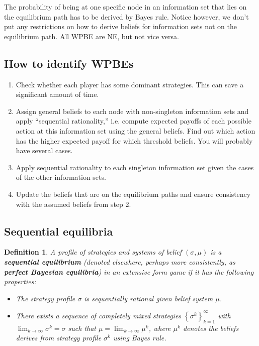 \documentclass[10pt]{article}
\theoremstyle{basic}
\newtheorem{definition}{Definition}[section]
\begin{document}
\begin{spacing}{1.0}
The probability of being at one specific node in an information set that
lies on the equilibrium path has to be derived by Bayes rule. Notice
however, we don't put any restrictions on how to derive beliefs for
information sets not on the equilibrium path. All WPBE are NE, but not vice versa.

\subsection{How to identify WPBEs}

\begin{enumerate}
\item Check whether each player has some dominant strategies. This can save
  a significant amount of time.
\item Assign general beliefs to each node with non-singleton information
  sets and apply ``sequential rationality,'' i.e. compute expected payoffs
  of each possible action at this information set using the general
  beliefs. Find out which action has the higher expected payoff for which
  threshold beliefs. You will probably have several cases.
\item Apply sequential rationality to each singleton information set given
  the cases of the other information sets.
\item Update the beliefs that are on the equilibrium paths and ensure
  consistency with the assumed beliefs from step 2.
\end{enumerate}

\subsection{Sequential equilibria}

\begin{definition}
  A profile of strategies and systems of belief $(\sigma, \mu)$ is a
  \textbf{sequential equilibrium} (denoted elsewhere, perhaps more
  consistently, as \textbf{perfect Bayesian equilibria}) in an extensive
  form game if it has the following properties:
  \begin{itemize}
  \item The strategy profile $\sigma$ is sequentially rational given belief
    system $\mu$.
  \item There exists a sequence of completely mixed strategies
    $\left\{\sigma^k\right\}_{k=1}^\infty$ with $\lim_{k \to \infty} \sigma^k =
    \sigma$ such that $\mu = \lim_{k \to \infty} \mu^k$, where $\mu^k$ denotes
    the beliefs derives from strategy profile $\sigma^k$ using Bayes rule.
  \end{itemize}
\end{definition}


\end{spacing}
\end{document}
